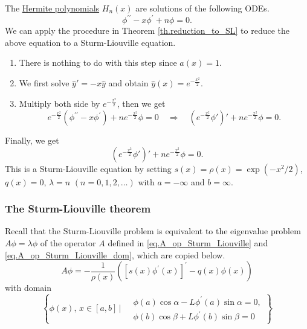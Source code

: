 \begin{example} The \underline{Hermite polynomials} $H_n(x)$ are solutions of the following ODEs.
    \begin{equation}\label{eq.Hermite}
        \phi^{\prime \prime}-x \phi^{\prime}+n \phi=0 .
    \end{equation}
    We can apply the procedure in Theorem \ref{th.reduction_to_SL} to reduce the above equation to a Sturm-Liouville equation.
    
    \begin{enumerate}
        \item There is nothing to do with this step since $a(x) = 1$.
        \item We first solve $\widehat{y}' = -x\widehat{y}$ and obtain $\widehat{y}(x) = e^{-\frac{x^2}{2}}$.
        \item Multiply both side by $e^{-\frac{x^2}{2}}$, then we get 
        \begin{equation}
            e^{-\frac{x^2}{2}}(\phi^{\prime \prime}-x \phi^{\prime})+n e^{-\frac{x^2}{2}} \phi=0 \quad \Rightarrow\quad \left(e^{-\frac{x^2}{2}}\phi'\right)'+n e^{-\frac{x^2}{2}}\phi=0.
        \end{equation}
    \end{enumerate}
    Finally, we get
    \begin{equation}\label{eq.Hermite_SL}
        \left(e^{-\frac{x^2}{2}}\phi'\right)'+n e^{-\frac{x^2}{2}}\phi=0.
    \end{equation}
    This is a Sturm-Liouville equation by setting $s(x)=\rho(x)=\exp \left(-x^2 / 2\right)$, $q(x)=0$, $\lambda=n$ $(n=0,1,2, \ldots)$ with $a=-\infty$ and $b=\infty$.
\end{example}


\subsubsection{The Sturm-Liouville theorem}
Recall that the Sturm-Liouville problem is equivalent to the eigenvalue problem $A \phi = \lambda \phi$ of the operator $A$ defined in \eqref{eq.A_op_Sturm_Liouville} and \eqref{eq.A_op_Sturm_Liouville_dom}, which are copied below. 
\begin{equation}\label{eq.A_op_Sturm_Liouville'}
    A \phi = - \frac{1}{\rho(x)}\left(\left[s(x) \phi^{\prime}(x)\right]^{\prime}-q(x) \phi(x)\right)
\end{equation}
with domain
\begin{equation}\label{eq.A_op_Sturm_Liouville_dom'}
    \left\{\phi(x),\, x\in [a, b]\,\Bigg|\begin{aligned}
        &\ \phi(a) \cos \alpha-L \phi^{\prime}(a) \sin \alpha=0,
        \\
        &\ \phi(b) \cos \beta+L \phi^{\prime}(b) \sin \beta=0
    \end{aligned}
    \right\}
\end{equation}


